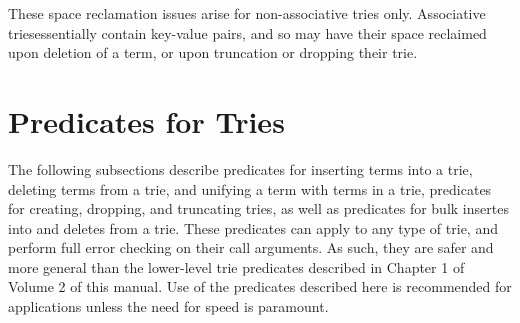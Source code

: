 
These space reclamation issues arise for non-associative tries only.
Associative triesessentially contain key-value pairs, and so may have
their space reclaimed upon deletion of a term, or upon truncation or
dropping their trie.

\section{Predicates for Tries} 
%
The following subsections describe predicates for inserting terms into
a trie, deleting terms from a trie, and unifying a term with terms in
a trie, predicates for creating, dropping, and truncating tries, as
well as predicates for bulk insertes into and deletes from a trie.
These predicates can apply to any type of trie, and perform full error
checking on their call arguments.  As such, they are safer and more
general than the lower-level trie predicates described in Chapter 1 of
Volume 2 of this manual.  Use of the predicates described here is
recommended for applications unless the need for speed is paramount.

